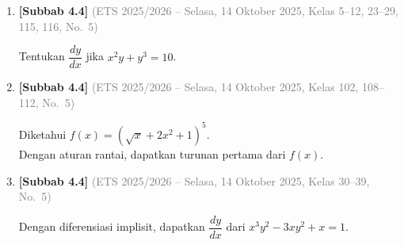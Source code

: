\documentclass[10pt,openany,a4paper]{article}
\theoremstyle{definition}
\theoremstyle{definition}
\theoremstyle{plain}
\begin{document}
\begin{enumerate}
    \item \textbf{[Subbab 4.4]} {\footnotesize\textcolor{gray}{(ETS 2025/2026 -- Selasa, 14 Oktober 2025, Kelas 5--12, 23--29, 115, 116, No.~5)}}\par
    Tentukan $\dfrac{dy}{dx}$ jika $x^2y+y^3=10$.

    \item \textbf{[Subbab 4.4]} {\footnotesize\textcolor{gray}{(ETS 2025/2026 -- Selasa, 14 Oktober 2025, Kelas 102, 108--112, No.~5)}}\par
    Diketahui $f(x)=(\sqrt{x}+2x^2+1)^5$.\\
    Dengan aturan rantai, dapatkan turunan pertama dari $f(x)$.

    \item \textbf{[Subbab 4.4]} {\footnotesize\textcolor{gray}{(ETS 2025/2026 -- Selasa, 14 Oktober 2025, Kelas 30--39, No.~5)}}\par
    Dengan diferensiasi implisit, dapatkan $\dfrac{dy}{dx}$ dari $x^3y^2-3xy^2+x=1$.

\end{enumerate}
\newpage
\end{document}
